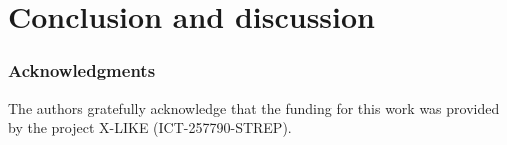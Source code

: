 \documentclass{article} %
\begin{document}
\section{Conclusion and discussion}

\subsubsection*{Acknowledgments}
   The authors gratefully acknowledge that the funding for this work was provided by the project X-LIKE (ICT-257790-STREP)\cite{xlike}.




\end{document}
